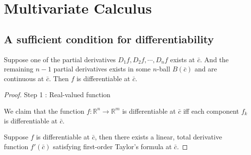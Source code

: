 \section{Multivariate Calculus}
\subsection{A sufficient condition for differentiability}
\begin{theorem}
Suppose one of the partial derivatives $D_1f,D_2f,\cdots,D_nf$ exists at $\bar{c}$.
And the remaining $n-1$ partial derivatives exists in some $n$-ball $B(\bar{c})$ and are continuous at $\bar{c}$.
Then $f$ is differentiable at $\bar{c}$.
\end{theorem}
\begin{proof}
Step 1 : Real-valued function

We claim that the function $f : \mathbb{R}^n \to \mathbb{R}^m$ is differentiable at $\bar{c}$ iff each component $f_k$ is differentiable at $\bar{c}$.

Suppose $f$ is differentiable at $\bar{c}$, then there exists a linear, total derivative function $f'(\bar{c})$ satisfying first-order Taylor's formula at $\bar{c}$.


\end{proof}
